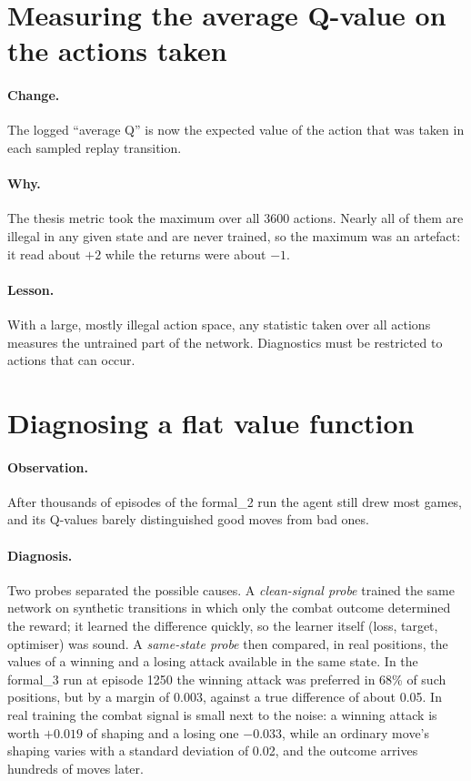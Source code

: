 \section{Measuring the average Q-value on the actions taken}

\paragraph{Change.} The logged ``average Q'' is now the expected value of the action that was
taken in each sampled replay transition.

\paragraph{Why.} The thesis metric took the maximum over all 3600 actions. Nearly all of them are
illegal in any given state and are never trained, so the maximum was an artefact: it read about
$+2$ while the returns were about $-1$.

\paragraph{Lesson.} With a large, mostly illegal action space, any statistic taken over all
actions measures the untrained part of the network. Diagnostics must be restricted to actions
that can occur.

\section{Diagnosing a flat value function}

\paragraph{Observation.} After thousands of episodes of the formal\_2 run the agent still drew
most games, and its Q-values barely distinguished good moves from bad ones.

\paragraph{Diagnosis.} Two probes separated the possible causes. A \emph{clean-signal probe}
trained the same network on synthetic transitions in which only the combat outcome determined the
reward; it learned the difference quickly, so the learner itself (loss, target, optimiser) was
sound. A \emph{same-state probe} then compared, in real positions, the values of a winning and a
losing attack available in the same state. In the formal\_3 run at episode 1250 the winning attack
was preferred in 68\% of such positions, but by a margin of 0.003, against a true difference of
about 0.05. In real training the combat signal is small next to the noise: a winning attack is
worth $+0.019$ of shaping and a losing one $-0.033$, while an ordinary move's shaping varies with
a standard deviation of 0.02, and the outcome arrives hundreds of moves later.

